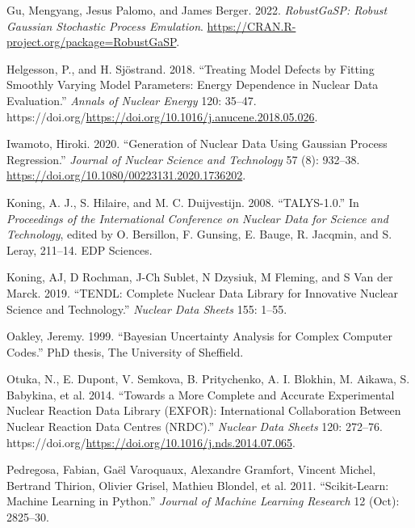 \documentclass[
  12pt,
  a4paper,
  twoside]{book}
\newlength{\cslhangindent}
\newlength{\cslentryspacingunit} %
\newenvironment{CSLReferences}[2] %
 {%
  \setlength{\parindent}{0pt}
  \ifodd #1
  \let\oldpar\par
  \def\par{\hangindent=\cslhangindent\oldpar}
  \fi
  \setlength{\parskip}{#2\cslentryspacingunit}
 }%
 {}
\begin{document}
\begin{CSLReferences}{1}{0}
\leavevmode{}%
Gu, Mengyang, Jesus Palomo, and James Berger. 2022. \emph{RobustGaSP: Robust Gaussian Stochastic Process Emulation}. \url{https://CRAN.R-project.org/package=RobustGaSP}.

\leavevmode{}%
Helgesson, P., and H. Sjöstrand. 2018. {``Treating Model Defects by Fitting Smoothly Varying Model Parameters: Energy Dependence in Nuclear Data Evaluation.''} \emph{Annals of Nuclear Energy} 120: 35--47. https://doi.org/\url{https://doi.org/10.1016/j.anucene.2018.05.026}.

\leavevmode{}%
Iwamoto, Hiroki. 2020. {``Generation of Nuclear Data Using Gaussian Process Regression.''} \emph{Journal of Nuclear Science and Technology} 57 (8): 932--38. \url{https://doi.org/10.1080/00223131.2020.1736202}.

\leavevmode{}%
Koning, A. J., S. Hilaire, and M. C. Duijvestijn. 2008. {``TALYS-1.0.''} In \emph{Proceedings of the International Conference on Nuclear Data for Science and Technology}, edited by O. Bersillon, F. Gunsing, E. Bauge, R. Jacqmin, and S. Leray, 211--14. EDP Sciences.

\leavevmode{}%
Koning, AJ, D Rochman, J-Ch Sublet, N Dzysiuk, M Fleming, and S Van der Marck. 2019. {``TENDL: Complete Nuclear Data Library for Innovative Nuclear Science and Technology.''} \emph{Nuclear Data Sheets} 155: 1--55.

\leavevmode{}%
Oakley, Jeremy. 1999. {``Bayesian Uncertainty Analysis for Complex Computer Codes.''} PhD thesis, The University of Sheffield.

\leavevmode{}%
Otuka, N., E. Dupont, V. Semkova, B. Pritychenko, A. I. Blokhin, M. Aikawa, S. Babykina, et al. 2014. {``Towards a More Complete and Accurate Experimental Nuclear Reaction Data Library (EXFOR): International Collaboration Between Nuclear Reaction Data Centres (NRDC).''} \emph{Nuclear Data Sheets} 120: 272--76. https://doi.org/\url{https://doi.org/10.1016/j.nds.2014.07.065}.

\leavevmode{}%
Pedregosa, Fabian, Gaël Varoquaux, Alexandre Gramfort, Vincent Michel, Bertrand Thirion, Olivier Grisel, Mathieu Blondel, et al. 2011. {``Scikit-Learn: Machine Learning in Python.''} \emph{Journal of Machine Learning Research} 12 (Oct): 2825--30.


\end{CSLReferences}
\end{document}
